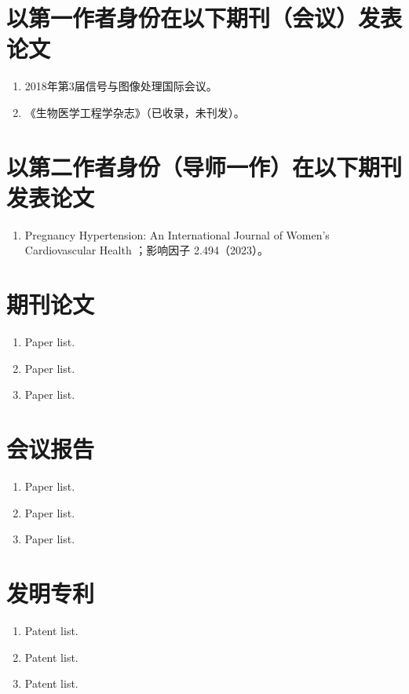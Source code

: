 \cleardoublepage
{}

{%
    \section*{以第一作者身份在以下期刊（会议）发表论文}
    \begin{enumerate}
        \item 2018年第3届信号与图像处理国际会议。
        \item 《生物医学工程学杂志》（已收录，未刊发）。
    \end{enumerate}

    \section*{以第二作者身份（导师一作）在以下期刊发表论文}
    \begin{enumerate}
        \item Pregnancy Hypertension: An International Journal of Women's Cardiovascular Health ；影响因子 2.494（2023）。
    \end{enumerate}
}
{%
    \section*{期刊论文}
    \begin{enumerate}
        \item Paper list.
        \item Paper list.
        \item Paper list.
    \end{enumerate}

    \section*{会议报告}
    \begin{enumerate}
        \item Paper list.
        \item Paper list.
        \item Paper list.
    \end{enumerate}

    \section*{发明专利}
    \begin{enumerate}
        \item Patent list.
        \item Patent list.
        \item Patent list.
    \end{enumerate}
}
